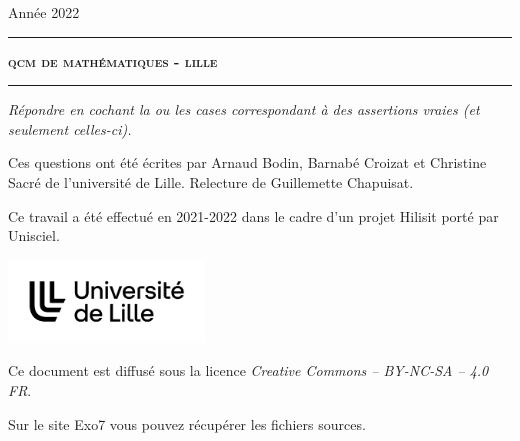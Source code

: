 \documentclass[11pt,a4paper]{article}
\begin{document}
 


\hfill{Année 2022}

\vspace*{0.5ex}
\hrule\vspace*{1.5ex} 
\hfil\textsc{\textbf{\LARGE qcm de mathématiques - lille}}
\vspace*{1.2ex} \hrule 
\vspace*{5ex} 


\vspace{4cm}

\begin{center}
\begin{minipage}{0.8\textwidth}
\center
\textit{Répondre en cochant la ou les cases correspondant à des assertions vraies (et seulement celles-ci).}
\end{minipage}
\end{center}
  
  


\vfill

\begin{center}
\begin{minipage}{0.8\textwidth}
\center
Ces questions ont été écrites par Arnaud Bodin, Barnabé Croizat et Christine Sacré de l'université de Lille. Relecture de Guillemette Chapuisat.
  
  \medskip
  
Ce travail a été effectué en 2021-2022 dans le cadre d'un projet Hilisit porté par Unisciel.
\end{minipage}

  \medskip

\qquad\qquad
\includegraphics[height=2.2cm]{logo-ulille}

  \medskip
  
Ce document est diffusé sous la licence \emph{Creative Commons -- BY-NC-SA -- 4.0 FR}.


Sur le site Exo7 vous pouvez récupérer les fichiers sources.

\end{center}


\newpage




\end{document}

